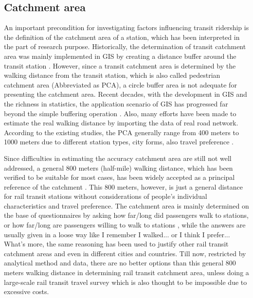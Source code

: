 %
\subsection{Catchment area}
An important precondition for investigating factors influencing transit ridership is the definition of the catchment area of a station, which has been interpreted in the part of research purpose. Historically, the determination of transit catchment area was mainly implemented in GIS by creating a distance buffer around the transit station \cite{o1992analysis,hsiao1997use,ayvalik2002heuristic,peng1997simultaneous}. However, since a transit catchment area is determined by the walking distance from the transit station, which is also called pedestrian catchment area (Abbreviated as PCA), a circle buffer area is not adequate for presenting the catchment area. Recent decades, with the development in GIS and the richness in statistics, the application scenario of GIS has progressed far beyond the simple buffering operation \cite{biba2010new,wu2003ptal,jiang2012walk}. Also, many efforts have been made to estimate the real walking distance by importing the data of real road network. According to the existing studies, the PCA generally range from 400 meters to 1000 meters due to different station types, city forms, also travel preference \cite{alshalalfah2007case,guerra2012half,keijer2000people,murray1998public,o1996walking,zhao2003forecasting}.

Since difficulties in estimating the accuracy catchment area are still not well addressed, a general 800 meters (half-mile) walking distance, which has been verified to be suitable for most cases, has been widely accepted as a principal reference of the catchment \cite{kuby2004factors,gutierrez2011transit,cardozo2012application,zhao2013influences}. This 800 meters, however, is just a general distance for rail transit stations without considerations of people's individual characteristics and travel preference. The catchment area is mainly determined on the base of questionnaires by asking how far/long did passengers walk to stations, or how far/long are passengers willing to walk to stations \cite{keijer2000people,zhao2003forecasting,garcia2013walking}, while the answers are usually given in a loose way like I remember I walked... or I think I prefer... What's more, the same reasoning has been used to justify other rail transit catchment areas and even in different cities and countries. Till now, restricted by analytical method and data, there are no better options than this general 800 meters walking distance in determining rail transit catchment area, unless doing a large-scale rail transit travel survey which is also thought to be impossible due to excessive costs.

